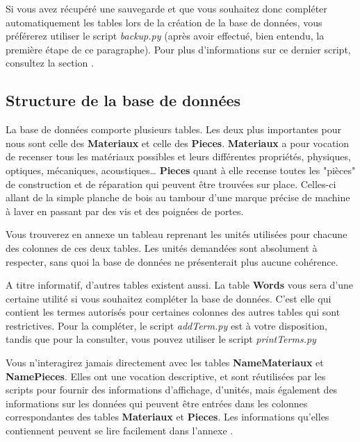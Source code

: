 \documentclass[12pt,a4paper]{article}
\begin{document}
        Si vous avez récupéré une sauvegarde et que vous souhaitez donc compléter
        automatiquement les tables lors de la création de la base de données, vous
        préférerez utiliser le script \emph{backup.py} (après avoir effectué, bien
        entendu, la première étape de ce paragraphe). Pour plus d'informations sur
        ce dernier script, consultez la section .

    \bigskip
    \subsection{Structure de la base de données}\label{structuredb}
        La base de données comporte plusieurs tables.
        Les deux plus importantes pour nous sont celle des \textbf{Materiaux} et celle des \textbf{Pieces}.
        \textbf{Materiaux} a pour vocation de recenser tous les matériaux possibles
        et leurs différentes propriétés, physiques, optiques, mécaniques, acoustiques\dots
        \textbf{Pieces} quant à elle recense toutes les "pièces" de construction et de réparation
        qui peuvent être trouvées sur place. Celles-ci allant de la simple planche de bois
        au tambour d'une marque précise de machine à laver en passant par des vis et des
        poignées de portes. 

        Vous trouverez en annexe un tableau reprenant les unités utilisées pour chacune des colonnes de ces deux tables.
        Les unités demandées sont absolument à respecter, sans quoi la base de données ne présenterait plus aucune cohérence.

        A titre informatif, d'autres tables existent aussi.
        La table \textbf{Words} vous sera d'une certaine utilité si vous souhaitez
        compléter la base de données. C'est elle qui contient les termes autorisés
        pour certaines colonnes des autres tables qui sont restrictives. Pour la
        compléter, le script \emph{addTerm.py} est à votre disposition, tandis que pour
        la consulter, vous pouvez utiliser le script \emph{printTerms.py}

        Vous n'interagirez jamais directement avec les tables \textbf{NameMateriaux}
        et \textbf{NamePieces}. Elles ont une vocation descriptive, et sont réutilisées
        par les scripts pour fournir des informations d'affichage, d'unités, mais également des
        informations sur les données qui peuvent être entrées dans les colonnes correspondantes
        des tables \textbf{Materiaux} et \textbf{Pieces}.
        Les informations qu'elles contiennent peuvent se lire facilement dans l'annexe
        .
\end{document}
